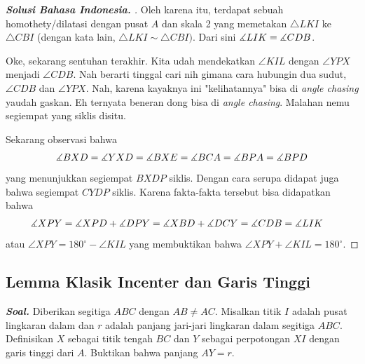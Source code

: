 \documentclass[letterpaper, 13pt]{scrartcl}
\begin{document}
\begin{proof}[\textbf{Solusi Bahasa Indonesia. }]
Oleh karena itu, terdapat sebuah homothety/dilatasi dengan pusat $A$ dan skala 2 yang memetakan $\triangle LKI$ ke $\triangle CBI$ (dengan kata lain, $\triangle LKI \sim \triangle CBI)$. Dari sini $\measuredangle LIK = \measuredangle CDB$. 

\begin{remark*}
    Oke, sekarang sentuhan terakhir. Kita udah mendekatkan $\angle KIL$ dengan $\angle YPX$ menjadi $\angle CDB$. Nah berarti tinggal cari nih gimana cara hubungin dua sudut, $\angle CDB$ dan $\angle YPX$. Nah, karena kayaknya ini "kelihatannya" bisa di \textit{angle chasing} yaudah gaskan. Eh ternyata beneran dong bisa di \textit{angle chasing}. Malahan nemu segiempat yang siklis disitu.
\end{remark*}
Sekarang observasi bahwa
\begin{align*}
    \measuredangle BXD = \measuredangle YXD = \measuredangle BXE = \measuredangle BCA = \measuredangle BPA = \measuredangle BPD
\end{align*}
yang menunjukkan segiempat $BXDP$ siklis. Dengan cara serupa didapat juga bahwa segiempat $CYDP$ siklis. Karena fakta-fakta tersebut bisa didapatkan bahwa
\begin{align*}
    \measuredangle XPY &= \measuredangle XPD + \measuredangle DPY = \measuredangle XBD +\measuredangle DCY = \measuredangle CDB = \measuredangle LIK
\end{align*}
atau $\angle XPY = 180^\circ - \angle KIL$ yang membuktikan bahwa $\angle XPY + \angle KIL = 180^\circ$.

\end{proof}

\subsection{Lemma Klasik Incenter dan Garis Tinggi}

\textbf{\textit{Soal. }}Diberikan segitiga $ABC$ dengan $AB \neq AC$. Misalkan titik $I$ adalah pusat lingkaran dalam dan $r$ adalah panjang jari-jari lingkaran dalam segitiga $ABC$. Definisikan $X$ sebagai titik tengah $BC$ dan $Y$ sebagai perpotongan $XI$ dengan garis tinggi dari $A$. Buktikan bahwa panjang $AY = r$.
\end{document}
